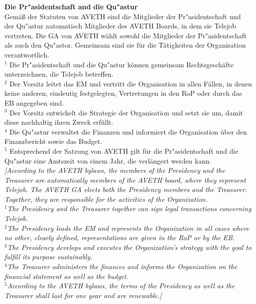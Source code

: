 \documentclass[10pt]{article}
\newcounter{qcounter}
\begin{document}
\begin{list}{{\bf Artikel :~}}{}
\item {\bf Die Pr"asidentschaft and die Qu"astur}\label{P&T}\\
Gemäß der Statuten von AVETH sind die Mitglieder der Pr"asidentschaft und der Qu"astur automatisch Mitglieder des AVETH Boards, in dem sie Telejob vertreten. Die GA von AVETH wählt sowohl die Mitglieder der Pr"asidentschaft als auch den Qu"astor. Gemeinsam sind sie für die Tätigkeiten der Organisation verantwortlich.\\
$^{1}$ Die Pr"asidentschaft und die Qu"astur können gemeinsam Rechtsgeschäfte unterzeichnen, die Telejob betreffen.\\
$^{2}$ Der Vorsitz leitet das EM und vertritt die Organisation in allen Fällen, in denen keine anderen, eindeutig festgelegten, Vertretungen in den RoP oder durch das EB angegeben sind.\\
$^{3}$ Der Vorsitz entwickelt die Strategie der Organisation und setzt sie um, damit diese nachhaltig ihren Zweck erfüllt.\\
$^{4}$ Die Qu"astur verwaltet die Finanzen und informiert die Organisation über den Finanzbericht sowie das Budget.\\
$^{5}$ Entsprechend der Satzung von AVETH gilt für die Pr"asidentschaft und die Qu"astur eine Amtszeit von einem Jahr, die verlängert werden kann.\\
{\it[According to the AVETH bylaws, the members of the Presidency and the Treasurer are automatically members of the AVETH board, where they represent Telejob. The AVETH GA elects both the Presidency members and the Treasurer. Together, they are responsible for the activities of the Organization. \\
$^{1}$The Presidency and the Treasurer together can sign legal transactions concerning Telejob.\\
$^{2}$The Presidency leads the EM and represents the Organization in all cases where no other, clearly defined, representations are given in the RoP or by the EB. \\
$^{3}$The Presidency develops and executes the Organization's strategy with the goal to fulfill its purpose sustainably.\\
$^{4}$The Treasurer administers the finances and informs the Organization on the financial statement as well as the budget.\\
$^{5}$According to the AVETH bylaws, the terms of the Presidency as well as the Treasurer shall last for one year and are renewable.]}


\end{list}
\end{document}
